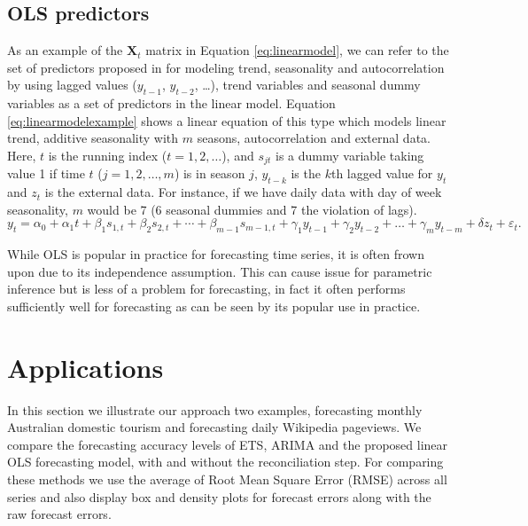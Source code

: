 \documentclass[11pt,a4paper,]{article}
\begin{document}
\hypertarget{ols-predictors}{%
\subsection{OLS predictors}\label{ols-predictors}}

As an example of the \(\bm{X}_t\) matrix in Equation \eqref{eq:linearmodel}, we can refer to the set of predictors proposed in \textcite{ashouri2018} for modeling trend, seasonality and autocorrelation by using lagged values (\(y_{t-1}\), \(y_{t-2}\), \dots), trend variables and seasonal dummy variables as a set of predictors in the linear model. Equation \eqref{eq:linearmodelexample} shows a linear equation of this type which models linear trend, additive seasonality with \(m\) seasons, autocorrelation and external data. Here, \(t\) is the running index (\(t=1,2,\dots\)), and \(s_{jt}\) is a dummy variable taking value 1 if time \(t\) (\(j=1, 2, \dots, m\)) is in season \(j\), \(y_{t-k}\) is the \(k\)th lagged value for \(y_t\) and \(z_t\) is the external data. For instance, if we have daily data with day of week seasonality, \(m\) would be 7 (6 seasonal dummies and 7 the violation of lags).
\begin{equation}\label{eq:linearmodelexample}
    y_t = \alpha_0 + \alpha_1 t + \beta_1 s_{1,t} + \beta_2 s_{2,t} + \cdots + \beta_{m-1} s_{m-1,t} + \gamma_1 y_{t-1} + \gamma_2 y_{t-2} + \dots + \gamma_m y_{t-m} + \delta z_t + \varepsilon_t.
\end{equation}

While OLS is popular in practice for forecasting time series, it is often frown upon due to its independence assumption. This can cause issue for parametric inference but is less of a problem for forecasting, in fact it often performs sufficiently well for forecasting as can be seen by its popular use in practice.

\hypertarget{applications}{%
\section{Applications}\label{applications}}

In this section we illustrate our approach two examples, forecasting monthly Australian domestic tourism and forecasting daily Wikipedia pageviews. We compare the forecasting accuracy levels of ETS, ARIMA and the proposed linear OLS forecasting model, with and without the reconciliation step. For comparing these methods we use the average of Root Mean Square Error (RMSE) across all series and also display box and density plots for forecast errors along with the raw forecast errors.
\end{document}
